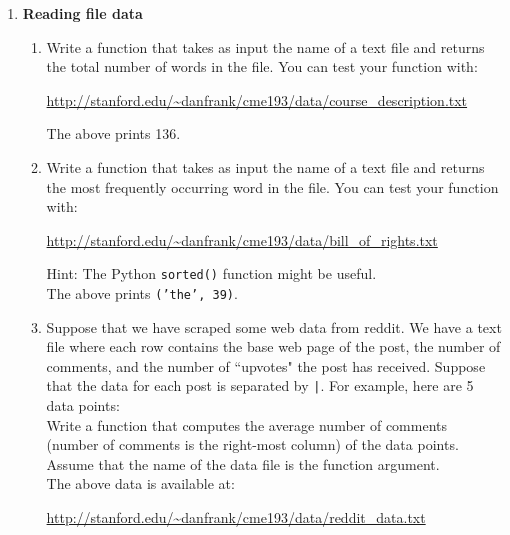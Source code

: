 \documentclass{article}
\newcounter{points}
\begin{document}
\pagestyle{fancy}
\begin{enumerate}

\item \textbf{Reading file data}
\begin{enumerate}
\item Write a function that takes as input the name of a text file and returns the total number of words in the file.  You can test your function with:
\begin{center}
\url{http://stanford.edu/~danfrank/cme193/data/course_description.txt}
\end{center}


The above prints 136.
\end{enumerate}

\begin{enumerate}
\setcounter{enumii}{1}
\item Write a function that takes as input the name of a text file and returns the most frequently occurring word in the file.  You can test your function with:
\begin{center}
\url{http://stanford.edu/~danfrank/cme193/data/bill_of_rights.txt}
\end{center}
Hint: The Python \texttt{sorted()} function might be useful. \\


The above prints \texttt{('the', 39)}.
\end{enumerate}

\newpage
\begin{enumerate}
\setcounter{enumii}{2}
\item Suppose that we have scraped some web data from reddit.  We have a text file where each row contains the base web page of the post, the number of comments, and the number of ``upvotes" the post has received.  Suppose that the data for each post is separated by \texttt{|}.  For example, here are 5 data points: \\

Write a function that computes the average number of comments (number of comments is the right-most column) of the data points.  Assume that the name of the data file is the function argument. \\

The above data is available at:
\begin{center}
\url{http://stanford.edu/~danfrank/cme193/data/reddit_data.txt}
\end{center}


\end{enumerate}
\end{enumerate}
\end{document}
